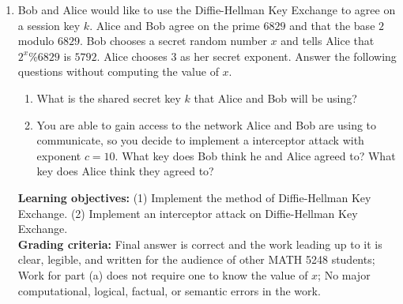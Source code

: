 \documentclass[12pt]{article}
\begin{document}
\begin{enumerate}
\item Bob and Alice would like to use the Diffie-Hellman Key Exchange to agree on a session key $k$. Alice and Bob agree on the prime $6829$ and that the base $2$ modulo $6829$. Bob chooses a secret random number $x$ and tells Alice that $2^x\%6829$ is $5792$. Alice chooses $3$ as her secret exponent.  Answer the following questions without computing the value of $x$. 
\begin{enumerate}
\item What is the shared secret key $k$ that Alice and Bob will be using?
\item You are able to gain access to the network Alice and Bob are using to communicate, so you decide to implement a interceptor attack with exponent $c=10$. What key does Bob think he and Alice agreed to? What key does Alice think they agreed to?
\end{enumerate}	
{\bf Learning objectives:} (1) Implement the method of Diffie-Hellman Key Exchange. (2) Implement an interceptor attack on Diffie-Hellman Key Exchange.\\
{\bf Grading criteria:} Final answer is correct and the work leading up to it is clear, legible, and written for the audience of other MATH 5248 students; Work for part (a) does not require one to know the value of $x$; No major computational, logical, factual, or semantic errors in the work.  

\end{enumerate}
\end{document}

